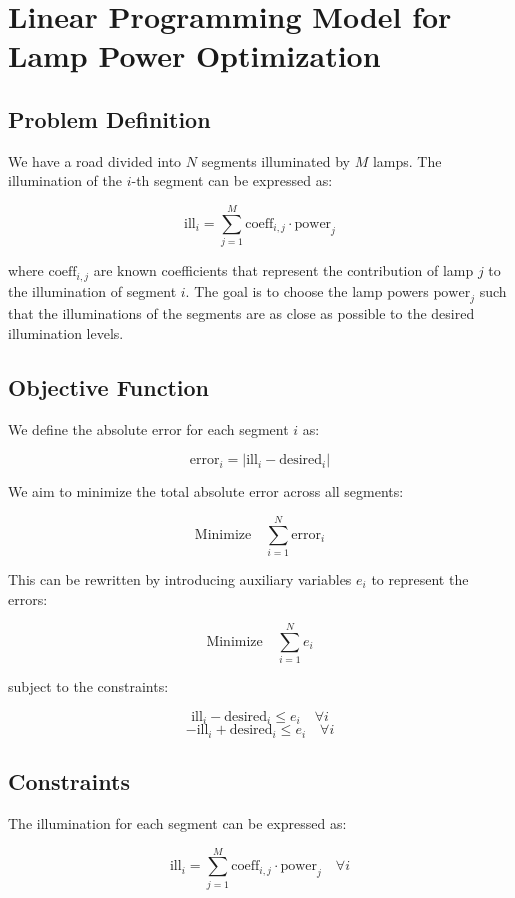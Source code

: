 \documentclass{article}
\begin{document}
\section*{Linear Programming Model for Lamp Power Optimization}

\subsection*{Problem Definition}

We have a road divided into \(N\) segments illuminated by \(M\) lamps. The illumination of the \(i\)-th segment can be expressed as:

\[
\text{ill}_i = \sum_{j=1}^{M} \text{coeff}_{i,j} \cdot \text{power}_j
\]

where \(\text{coeff}_{i,j}\) are known coefficients that represent the contribution of lamp \(j\) to the illumination of segment \(i\). The goal is to choose the lamp powers \(\text{power}_j\) such that the illuminations of the segments are as close as possible to the desired illumination levels.

\subsection*{Objective Function}

We define the absolute error for each segment \(i\) as:

\[
\text{error}_i = | \text{ill}_i - \text{desired}_i |
\]

We aim to minimize the total absolute error across all segments:

\[
\text{Minimize} \quad \sum_{i=1}^{N} \text{error}_i
\]

This can be rewritten by introducing auxiliary variables \(e_i\) to represent the errors:

\[
\text{Minimize} \quad \sum_{i=1}^{N} e_i
\]

subject to the constraints:

\[
\text{ill}_i - \text{desired}_i \leq e_i \quad \forall i
\]
\[
-\text{ill}_i + \text{desired}_i \leq e_i \quad \forall i
\]

\subsection*{Constraints}

The illumination for each segment can be expressed as:

\[
\text{ill}_i = \sum_{j=1}^{M} \text{coeff}_{i,j} \cdot \text{power}_j \quad \forall i
\]
\end{document}
